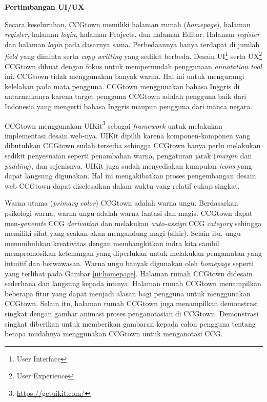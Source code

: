 \noindent\textbf{Pertimbangan UI/UX}

Secara keseluruhan, CCGtown memiliki halaman rumah (\textit{homepage}), halaman \textit{register},
halaman \textit{login}, halaman Projects, dan halaman Editor.
Halaman \textit{register} dan halaman \textit{login} pada dasarnya sama.
Perbedaannya hanya terdapat di jumlah \textit{field} yang diminta serta \textit{copy writting}
yang sedikit berbeda. Desain UI\footnote{User Interface} serta UX\footnote{User Experience}
CCGtown dibuat dengan fokus untuk mempermudah penggunaan \textit{annotation tool} ini.
CCGtown tidak menggunakan banyak warna. Hal ini untuk mengurangi kelelahan pada mata pengguna.
CCGtown menggunakan bahasa Inggris di antarmukanya karena target pengguna CCGtown adalah
pengguna baik dari Indonesia yang mengerti bahasa Inggris maupun pengguna dari manca negara.

CCGtown menggunakan UIKit\footnote{\url{https://getuikit.com/}} sebagai \textit{framework}
untuk melakukan implementasi desain web-nya. UIKit dipilih karena komponen-komponen yang
dibutuhkan CCGtown sudah tersedia sehingga CCGtown hanya perlu melakukan sedikit penyesuaian
seperti penambahan warna, pengaturan jarak (\textit{margin} dan \textit{padding}), dan sejenisnya.
UIKit juga sudah menyediakan kumpulan \textit{icons} yang dapat langsung digunakan.
Hal ini mengakibatkan proses pengembangan desain web CCGtown dapat diselesaikan dalam waktu yang
relatif cukup singkat.

Warna utama (\textit{primary color}) CCGtown adalah warna ungu.
Berdasarkan psikologi warna, warna ungu adalah warna fantasi dan magis.
CCGtown dapat men-\textit{generate} CCG \textit{derivation} dan melakukan \textit{auto-assign}
CCG \textit{category} sehingga memiliki sifat yang seakan-akan mengandung magi (sihir).
Selain itu, ungu menumbuhkan kreativitas dengan membangkitkan indra kita sambil mempromosikan
ketenangan yang diperlukan untuk melakukan pengamatan yang intuitif dan berwawasan.
Warna ungu banyak digunakan oleh \textit{homepage} seperti yang terlihat pada Gambar
\ref{ui:homepage}. Halaman rumah CCGtown didesain sederhana dan langsung kepada intinya.
Halaman rumah CCGtown menampilkan beberapa fitur yang dapat menjadi alasan bagi pengguna
untuk menggunakan CCGtown. Selain itu, halaman rumah CCGtown juga menampilkan demonstrasi
singkat dengan gambar animasi proses penganotasian di CCGtown. Demonstrasi singkat
diberikan untuk memberikan gambaran kepada calon pengguna tentang betapa mudahnya
menggunakan CCGtown untuk menganotasi CCG.

